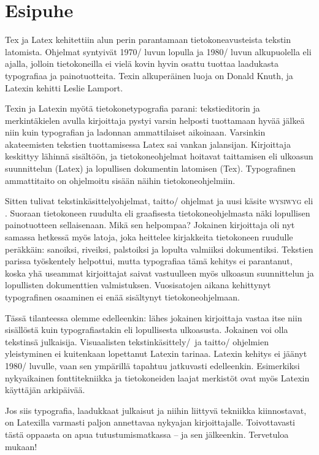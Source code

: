 
\chapter{Esipuhe}

Tex ja Latex kehitettiin alun perin parantamaan tietokoneavusteista
tekstin latomista. Ohjelmat syntyivät 1970\-/ luvun lopulla ja 1980\-/
luvun alkupuolella eli ajalla, jolloin tietokoneilla ei vielä kovin
hyvin osattu tuottaa laadukasta typografiaa ja painotuotteita. Texin
alkuperäinen luoja on Donald Knuth, ja Latexin kehitti Leslie Lamport.

Texin ja Latexin myötä tietokonetypografia parani: tekstieditorin ja
merkintäkielen avulla kirjoittaja pystyi varsin helposti tuottamaan
hyvää jälkeä niin kuin typografian ja ladonnan ammattilaiset aikoinaan.
Varsinkin akateemisten tekstien tuottamisessa Latex sai vankan
jalansijan. Kirjoittaja keskittyy lähinnä sisältöön, ja
tietokoneohjelmat hoitavat taittamisen eli ulkoasun suunnittelun (Latex)
ja lopullisen dokumentin latomisen (Tex). Typografinen ammattitaito on
ohjelmoitu sisään näihin tietokoneohjelmiin.

Sitten tulivat tekstinkäsittelyohjelmat, taitto\-/ ohjelmat ja uusi
käsite \textsc{wy\-si\-wyg} eli . Suoraan tietokoneen ruudulta eli graafisesta tietokoneohjelmasta
näki lopullisen painotuotteen sellaisenaan. Mikä sen helpompaa? Jokainen
kirjoittaja oli nyt samassa hetkessä myös latoja, joka heittelee
kirjakkeita tietokoneen ruudulle peräkkäin: sanoiksi, riveiksi,
palstoiksi ja lopulta valmiiksi dokumentiksi. Tekstien parissa
työskentely helpottui, mutta typografiaa tämä kehitys ei parantanut,
koska yhä useammat kirjoittajat saivat vastuulleen myös ulkoasun
suunnittelun ja lopullisten dokumenttien valmistuksen. Vuosisatojen
aikana kehittynyt typografinen osaaminen ei enää sisältynyt
tietokoneohjelmaan.

Tässä tilanteessa olemme edelleenkin: lähes jokainen kirjoittaja vastaa
itse niin sisällöstä kuin typografiastakin eli lopullisesta ulkoasusta.
Jokainen voi olla tekstinsä julkaisija. Visuaalisten
tekstinkäsittely\-/\ ja taitto\-/ ohjelmien yleistyminen ei kuitenkaan
lopettanut Latexin tarinaa. Latexin kehitys ei jäänyt 1980\-/ luvulle,
vaan sen ympärillä tapahtuu jatkuvasti edelleenkin. Esimerkiksi
nykyaikainen fonttitekniikka ja tietokoneiden laajat merkistöt ovat myös
Latexin käyttäjän arkipäivää.

Jos siis typografia, laadukkaat julkaisut ja niihin liittyvä tekniikka
kiinnostavat, on Latexilla varmasti paljon annettavaa nykyajan
kirjoittajalle. Toivottavasti tästä oppaasta on apua tutustumismatkassa
-- ja sen jälkeenkin. Tervetuloa mukaan!
